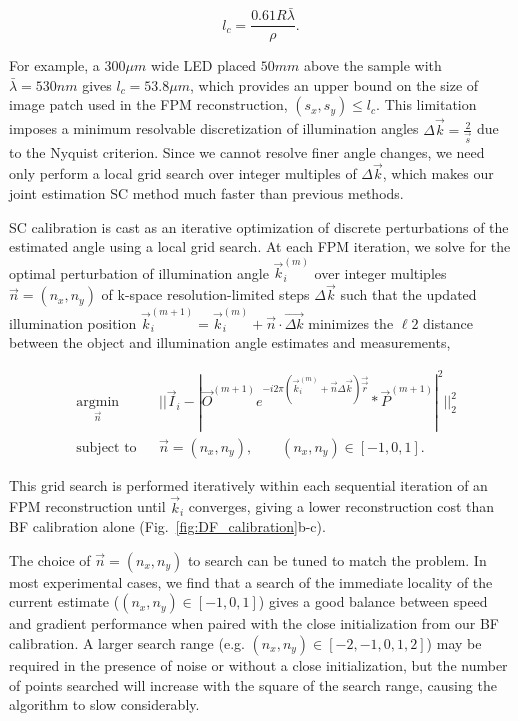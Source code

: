 \begin{equation}\label{eq:vancittert_zernike}
l_c = \frac{0.61 R \bar{\lambda}}{\rho}.
\end{equation}

\noindent For example, a $300\mu m$ wide LED placed $50 mm$ above the sample with $\bar{\lambda} = 530nm$ gives $l_c = 53.8\mu m$, which provides an upper bound on the size of image patch used in the FPM reconstruction, $(s_x,s_y) \leq l_c$. This limitation imposes a minimum resolvable discretization of illumination angles $\Delta{\vec{k}} = \frac{2}{\vec{s}}$ due to the Nyquist criterion. Since we cannot resolve finer angle changes, we need only perform a local grid search over integer multiples of $\Delta{\vec{k}}$, which makes our joint estimation SC method much faster than previous methods.

SC calibration is cast as an iterative optimization of discrete perturbations of the estimated angle using a local grid search. At each FPM iteration, we solve for the optimal perturbation of illumination angle  $\vec{{k}}_i^{(m)}$ over integer multiples $\vec{n} = (n_x, n_y)$ of k-space resolution-limited steps $\Delta \vec{k}$ such that the updated illumination position $\vec{k}_i^{(m+1)} = \vec{{k}}_i^{(m)} + \vec{n} \cdot \vec{\Delta {k}}$ minimizes the $\ell 2$ distance between the object and illumination angle estimates and measurements,

\begin{equation}\label{Eq:positionOpt}
    \begin{aligned}
    & \underset{\vec{n}}{\text{argmin}}
    & & ||\vec{I}_{i}- |\vec{O}^{(m+1)} e^{-i2\pi (\vec{{k}}_i^{(m)} + \vec{n} \Delta\vec{{k}})\vec{\vec{r}}} * \vec{P}^{(m+1)}|^2||_2^2 \\
    & \text{subject to}
    & &  \vec{n} = (n_x, n_y), \qquad (n_x, n_y) \in [-1, 0 ,1].
    \end{aligned}
\end{equation}

\noindent This grid search is performed iteratively within each sequential iteration of an FPM reconstruction until $\vec{k}_i$ converges, giving a lower reconstruction cost than BF calibration alone (Fig.~\ref{fig:DF_calibration}b-c).

The choice of $\vec{n} = (n_x, n_y)$ to search can be tuned to match the problem. In most experimental cases, we find that a search of the immediate locality of the current estimate ($(n_x, n_y) \in [-1, 0 ,1]$) gives a good balance between speed and gradient performance when paired with the close initialization from our BF calibration. A larger search range (e.g. $(n_x, n_y) \in [-2, -1, 0, 1, 2]$) may be required in the presence of noise or without a close initialization, but the number of points searched will increase with the square of the search range, causing the algorithm to slow considerably.



